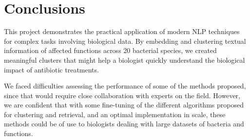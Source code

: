 \documentclass{article}
\begin{document}
\section{Conclusions}
This project demonstrates the practical application of modern NLP techniques for  complex tasks involving biological data. By embedding and clustering textual information of affected functions across 20 bacterial species, we created meaningful clusters that might help a biologist quickly understand the biological impact of antibiotic treatments.

We faced difficulties assessing the performance of some of the methods proposed, since that would require close collaboration with experts on the field. However, we are confident that with some fine-tuning of the different algorithms proposed for clustering and retrieval, and an optimal implementation in scale, these methods could be of use to biologists dealing with large datasets of bacteria and functions.
\printbibliography %
\end{document}
